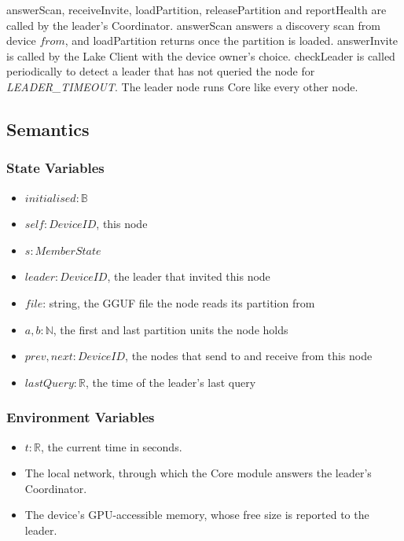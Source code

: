 \documentclass[12pt, titlepage]{article}
\begin{document}
\noindent answerScan, receiveInvite, loadPartition, releasePartition and
reportHealth are called by the leader's Coordinator. answerScan answers a
discovery scan from device $\mathit{from}$, and loadPartition returns once the partition is
loaded. answerInvite is called by the Lake Client with the device owner's
choice. checkLeader is called periodically to detect a leader that has
not queried the node for \textit{LEADER\_TIMEOUT}. The leader node
runs Core like every other node.

\subsection{Semantics}

\subsubsection{State Variables}

\begin{itemize}
  \item $\mathit{initialised}: \mathbb{B}$
  \item $\mathit{self}: \mathit{DeviceID}$, this node
  \item $s: \mathit{MemberState}$
  \item $\mathit{leader}: \mathit{DeviceID}$, the leader that invited this node
  \item $\mathit{file}$: string, the GGUF file the node reads its partition
    from
  \item $a, b: \mathbb{N}$, the first and last partition units the node holds
  \item $\mathit{prev}, \mathit{next}: \mathit{DeviceID}$, the nodes that send
    to and receive from this node
  \item $\mathit{lastQuery}: \mathbb{R}$, the time of the leader's last query
\end{itemize}

\subsubsection{Environment Variables}

\begin{itemize}
  \item $t: \mathbb{R}$, the current time in seconds.
  \item The local network, through which the Core module answers the leader's
    Coordinator.
  \item The device's GPU-accessible memory, whose free size is reported to the
    leader.
\end{itemize}
\end{document}
